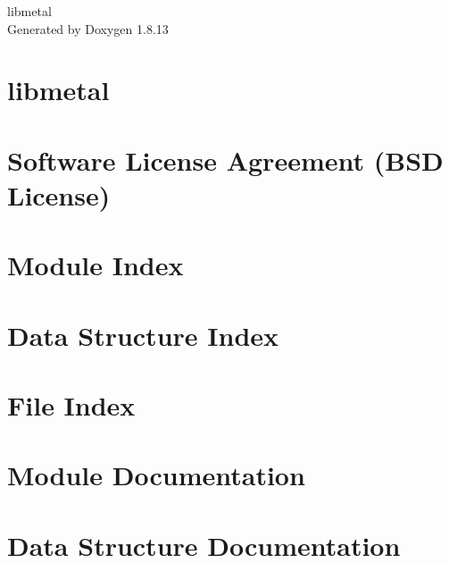 \documentclass[twoside]{book}
\newcommand{\+}{\discretionary{\mbox{\scriptsize$\hookleftarrow$}}{}{}}
\newcommand{\clearemptydoublepage}{%
  \newpage{\pagestyle{empty}\cleardoublepage}%
}
\begin{document}
\hypersetup{pageanchor=false,
             bookmarksnumbered=true,
             pdfencoding=unicode
            }
\begin{titlepage}
\vspace*{7cm}
\begin{center}%
{\Large libmetal }\\
\vspace*{1cm}
{\large Generated by Doxygen 1.8.13}\\
\end{center}
\end{titlepage}
\clearemptydoublepage
{}
\tableofcontents
\clearemptydoublepage
{}
\hypersetup{pageanchor=true}

\chapter{libmetal}
\label{index}\hypertarget{index}{}
\chapter{Software License Agreement (B\+SD License)}
\label{md__l_i_c_e_n_s_e}

\chapter{Module Index}

\chapter{Data Structure Index}

\chapter{File Index}

\chapter{Module Documentation}


















\chapter{Data Structure Documentation}





















\end{document}
